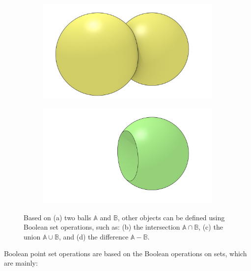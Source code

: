 \begin{figure}
\begin{subfigure}[b]{0.5\linewidth}
\caption{}%
\label{subfig:boolean-intersection}
\end{subfigure}\\
\begin{subfigure}[b]{0.5\linewidth}
\includegraphics[width=\linewidth]{figs/boolean-union}
\caption{}%
\label{subfig:boolean-union}
\end{subfigure}%
\begin{subfigure}[b]{0.5\linewidth}
\includegraphics[width=\linewidth]{figs/boolean-difference}
\caption{}%
\label{subfig:boolean-difference}
\end{subfigure}
\caption{Based on (a) two balls \(\mathbb{A}\) and \(\mathbb{B}\), other objects can be defined using Boolean set operations, such as: (b) the intersection \(\mathbb{A} \cap \mathbb{B}\), (c) the union \(\mathbb{A} \cup \mathbb{B}\), and (d) the difference \(\mathbb{A} - \mathbb{B}\).}%
\label{fig:boolean}
\end{figure}

Boolean point set operations are based on the Boolean operations on sets, which are mainly:


